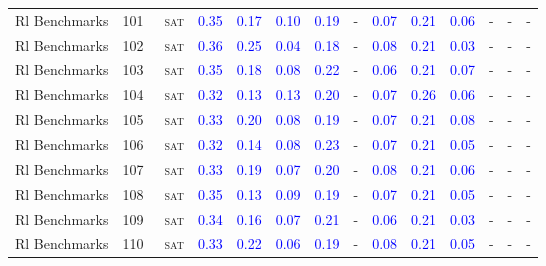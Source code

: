 \begin{center}
{\begin{longtable}{@{}llllllllllllll@{}}
Rl Benchmarks & 101 & ~\textsc{sat} & \textcolor{blue}{0.35} & \textcolor{blue}{0.17} & \textcolor{blue}{0.10} & \textcolor{blue}{0.19} & - & \textcolor{blue}{0.07} & \textcolor{blue}{0.21} & \textcolor{blue}{0.06} & - & - & - \\
Rl Benchmarks & 102 & ~\textsc{sat} & \textcolor{blue}{0.36} & \textcolor{blue}{0.25} & \textcolor{blue}{0.04} & \textcolor{blue}{0.18} & - & \textcolor{blue}{0.08} & \textcolor{blue}{0.21} & \textcolor{blue}{0.03} & - & - & - \\
Rl Benchmarks & 103 & ~\textsc{sat} & \textcolor{blue}{0.35} & \textcolor{blue}{0.18} & \textcolor{blue}{0.08} & \textcolor{blue}{0.22} & - & \textcolor{blue}{0.06} & \textcolor{blue}{0.21} & \textcolor{blue}{0.07} & - & - & - \\
Rl Benchmarks & 104 & ~\textsc{sat} & \textcolor{blue}{0.32} & \textcolor{blue}{0.13} & \textcolor{blue}{0.13} & \textcolor{blue}{0.20} & - & \textcolor{blue}{0.07} & \textcolor{blue}{0.26} & \textcolor{blue}{0.06} & - & - & - \\
Rl Benchmarks & 105 & ~\textsc{sat} & \textcolor{blue}{0.33} & \textcolor{blue}{0.20} & \textcolor{blue}{0.08} & \textcolor{blue}{0.19} & - & \textcolor{blue}{0.07} & \textcolor{blue}{0.21} & \textcolor{blue}{0.08} & - & - & - \\
Rl Benchmarks & 106 & ~\textsc{sat} & \textcolor{blue}{0.32} & \textcolor{blue}{0.14} & \textcolor{blue}{0.08} & \textcolor{blue}{0.23} & - & \textcolor{blue}{0.07} & \textcolor{blue}{0.21} & \textcolor{blue}{0.05} & - & - & - \\
Rl Benchmarks & 107 & ~\textsc{sat} & \textcolor{blue}{0.33} & \textcolor{blue}{0.19} & \textcolor{blue}{0.07} & \textcolor{blue}{0.20} & - & \textcolor{blue}{0.08} & \textcolor{blue}{0.21} & \textcolor{blue}{0.06} & - & - & - \\
Rl Benchmarks & 108 & ~\textsc{sat} & \textcolor{blue}{0.35} & \textcolor{blue}{0.13} & \textcolor{blue}{0.09} & \textcolor{blue}{0.19} & - & \textcolor{blue}{0.07} & \textcolor{blue}{0.21} & \textcolor{blue}{0.05} & - & - & - \\
Rl Benchmarks & 109 & ~\textsc{sat} & \textcolor{blue}{0.34} & \textcolor{blue}{0.16} & \textcolor{blue}{0.07} & \textcolor{blue}{0.21} & - & \textcolor{blue}{0.06} & \textcolor{blue}{0.21} & \textcolor{blue}{0.03} & - & - & - \\
Rl Benchmarks & 110 & ~\textsc{sat} & \textcolor{blue}{0.33} & \textcolor{blue}{0.22} & \textcolor{blue}{0.06} & \textcolor{blue}{0.19} & - & \textcolor{blue}{0.08} & \textcolor{blue}{0.21} & \textcolor{blue}{0.05} & - & - & - \\

\end{longtable}}
\end{center}
